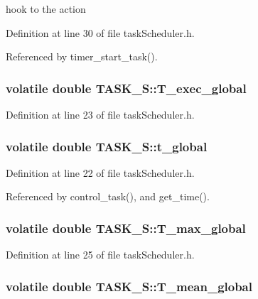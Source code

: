 hook to the action 



Definition at line 30 of file taskScheduler.h.



Referenced by timer\_\-start\_\-task().

\hypertarget{structTASK__S_ae06b712fd9963cff8192e9ef3140bc6d}{
\subsubsection[{T\_\-exec\_\-global}]{\setlength{\rightskip}{0pt plus 5cm}volatile double {\bf TASK\_\-S::T\_\-exec\_\-global}}}
\label{structTASK__S_ae06b712fd9963cff8192e9ef3140bc6d}


Definition at line 23 of file taskScheduler.h.

\hypertarget{structTASK__S_a29a175bdd4b9f880a2b69bb5186e3c7e}{
\subsubsection[{t\_\-global}]{\setlength{\rightskip}{0pt plus 5cm}volatile double {\bf TASK\_\-S::t\_\-global}}}
\label{structTASK__S_a29a175bdd4b9f880a2b69bb5186e3c7e}


Definition at line 22 of file taskScheduler.h.



Referenced by control\_\-task(), and get\_\-time().

\hypertarget{structTASK__S_a430c874cbf361b6dbc75ad1540880948}{
\subsubsection[{T\_\-max\_\-global}]{\setlength{\rightskip}{0pt plus 5cm}volatile double {\bf TASK\_\-S::T\_\-max\_\-global}}}
\label{structTASK__S_a430c874cbf361b6dbc75ad1540880948}


Definition at line 25 of file taskScheduler.h.

\hypertarget{structTASK__S_a9ebae87e1b64869f328a47473f2ea7d7}{
\subsubsection[{T\_\-mean\_\-global}]{\setlength{\rightskip}{0pt plus 5cm}volatile double {\bf TASK\_\-S::T\_\-mean\_\-global}}}
\label{structTASK__S_a9ebae87e1b64869f328a47473f2ea7d7}


